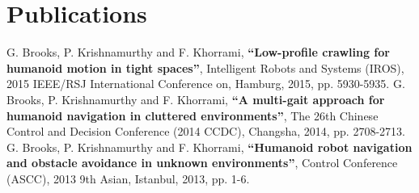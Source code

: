 \documentclass[letterpaper]{twentysecondcv} %
\begin{document}
\section{Publications}
G. Brooks, P. Krishnamurthy and F. Khorrami, \textbf{“Low-profile crawling for humanoid motion in tight spaces”}, Intelligent Robots and Systems (IROS), 2015 IEEE/RSJ International Conference on, Hamburg, 2015, pp. 5930-5935.\vspace{2mm}
G. Brooks, P. Krishnamurthy and F. Khorrami, \textbf{“A multi-gait approach for humanoid navigation in cluttered environments”}, The 26th Chinese Control and Decision Conference (2014 CCDC), Changsha, 2014, pp. 2708-2713.\vspace{2mm}
G. Brooks, P. Krishnamurthy and F. Khorrami, \textbf{“Humanoid robot navigation and obstacle avoidance in unknown environments”}, Control Conference (ASCC), 2013 9th Asian, Istanbul, 2013, pp. 1-6.\vspace{2mm}
\end{document}
